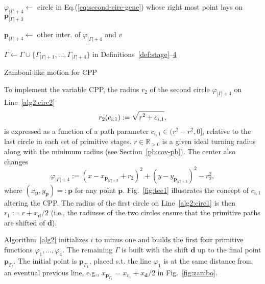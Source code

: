 \documentclass[letterpaper,10pt,journal,twoside]{IEEEtran}
\theoremstyle{definition}
\begin{document}
\begin{algorithm}[t]
\begin{algorithmic}[1]
          \STATE $\varphi_{|\Gamma|+4}\gets$ circle in Eq.\hspace*{.7ex}(\ref{eq:second-circ-gene}) 
          whose right most point lays\vspace*{.3ex} \hspace*{1em}on $\mathbf{p}_{|\Gamma|+3}$\vspace*{.3ex}\label{alg2:circ2}

          \STATE $\mathbf{p}_{|\Gamma|+4}\gets$ other inter. %
          of $\varphi_{|\Gamma|+4}$ and $v$\vspace*{.3ex}\label{alg2:trig4}

          \vspace*{.8ex}
          \STATE $\Gamma\gets\Gamma\cup\{\Gamma_{|\Gamma|+1},\dots,\Gamma_{|\Gamma|+4}\}${ in Definitions~\ref{def:stage}--\hyperref[def:plan]{4}}\label{alg2:last}

        \ENDIF
      \ENDIF
    \ENDFOR
  \end{algorithmic}
  \caption{Zamboni-like motion for CPP}\label{alg2}
\end{algorithm}

To implement the variable CPP, the radius $r_2$ of the second circle $\varphi_{|\Gamma|+4}$ on Line~\ref{alg2:circ2}
\vspace*{-1ex}
\begin{equation}\label{eq:r2}
  {\small r_2(c_{i,1}):=\sqrt{\smash[b]{r^2+c_{i,1}}},}
  \vspace*{-.4ex}
\end{equation}
is expressed as a function of a path parameter $c_{i,1}\in(\underline{r}^2-r^2,0]$, relative to the last circle in each set of primitive stages. $r\in\mathbb{R}_{>0}$ is a given ideal turning radius along with the minimum radius (see Section~\ref{pb:cov-pb}). The center also changes
\begin{equation}\label{eq:second-circ-gene}
  \varphi_{|\Gamma|+4}:=(x-x_{\mathbf{p}_{|\Gamma|+3}}+r_2)^2+(y-y_{\mathbf{p}_{|\Gamma|+3}})^2-r_2^2,
\end{equation}
where $(x_\mathbf{p},y_\mathbf{p})=:\mathbf{p}$ for any point $\mathbf{p}$. Fig.~\ref{fig:tee1} illustrates the concept of $c_{i,1}$ altering the CPP. The radius of the first circle on Line~\ref{alg2:circ1} is then $r_1:=r+x_\mathbf{d}/2$ (i.e., the radiuses of the two circles ensure that the primitive paths are shifted of $\mathbf{d}$).%

Algorithm~\ref{alg2} initializes $i$ to minus one and builds the first four primitive functions $\varphi_1,\dots,\varphi_4$. The remaining $\Gamma$ is built with the shift $\mathbf{d}$ up to the final point $\mathbf{p}_{\Gamma_l}$. The initial point is $\mathbf{p}_{\Gamma_1}$, placed s.t. the line $\varphi_1$ is at the same distance from an eventual previous line, e.g., $x_{\mathbf{p}_{\Gamma_1}}=x_{v_1}+x_{\mathbf{d}}/2$ in Fig.~\ref{fig:zambo}.
\end{document}
